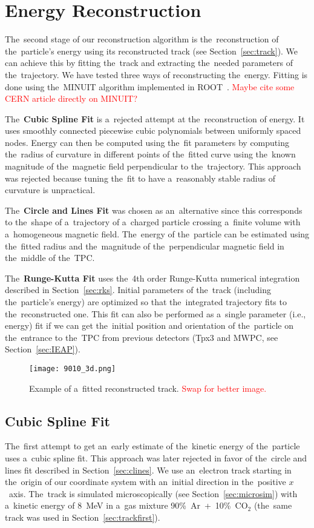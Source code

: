 \chapter{Energy Reconstruction}
\label{sec:energy}
	The~second stage of our reconstruction algorithm is the~reconstruction of the~particle's energy using its reconstructed track (see Section~\ref{sec:track}). We can achieve this by fitting the~track and extracting the~needed parameters of the~trajectory. We have tested three ways of reconstructing the~energy. Fitting is done using the~MINUIT algorithm implemented in ROOT~\cite{ROOT}. \textcolor{red}{Maybe cite some CERN article directly on MINUIT?}
	
	The~\textbf{Cubic Spline Fit} is a~rejected attempt at the~reconstruction of energy. It uses smoothly connected piecewise cubic polynomials between uniformly spaced nodes. Energy can then be computed using the~fit parameters by computing the~radius of curvature in different points of the~fitted curve using the~known magnitude of the~magnetic field perpendicular to the~trajectory. This approach was rejected because tuning the~fit to have a~reasonably stable radius of curvature is unpractical.
	
	The~\textbf{Circle and Lines Fit} was chosen as an~alternative since this corresponds to the~shape of a~trajectory of a~charged particle crossing a~finite volume with a~homogeneous magnetic field. The~energy of the~particle can be estimated using the~fitted radius and the~magnitude of the~perpendicular magnetic field in the~middle of the~\ac{TPC}.
	
	The~\textbf{Runge-Kutta Fit} uses the~4th order Runge-Kutta numerical integration described in Section~\ref{sec:rks}. Initial parameters of the~track (including the~particle's energy) are optimized so that the~integrated trajectory fits to the~reconstructed one. This fit can also be performed as a~single parameter (i.e., energy) fit if we can get the~initial position and orientation of the~particle on the~entrance to the~\ac{TPC} from previous detectors (\ac{Tpx3} and \ac{MWPC}, see Section~\ref{sec:IEAP}).
	
	\begin{figure}
		\centering
		\texttt{[image: 9010\_3d.png]}
		\caption{Example of a~fitted reconstructed track. \textcolor{red}{Swap for better image.}}
		\label{fig:90103d}
	\end{figure}
	
	\section{Cubic Spline Fit}
	\label{sec:cspline}
		The~first attempt to get an~early estimate of the~kinetic energy of the~particle uses a~cubic spline fit. This approach was later rejected in favor of the~circle and lines fit described in Section~\ref{sec:clines}. We use an~electron track starting in the~origin of our coordinate system with an~initial direction in the~positive $x$~axis. The~track is simulated microscopically (see Section~\ref{sec:microsim}) with a~kinetic energy of 8~MeV in a~gas mixture 90\%~Ar~+~10\%~CO$_2$ (the~same track was used in Section~\ref{sec:trackfirst}).
				
